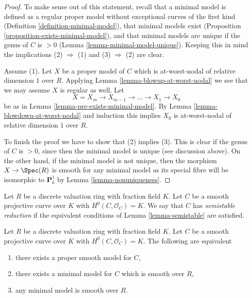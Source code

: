 \begin{proof}
To make sense out of this statement, recall that a
minimal model is defined as a regular proper model
without exceptional curves of the first kind
(Definition \ref{definition-minimal-model}),
that minimal models exist
(Proposition \ref{proposition-exists-minimal-model}), and
that minimal models are unique if the genus
of $C$ is $> 0$ (Lemma \ref{lemma-minimal-model-unique}).
Keeping this in mind the implications (2) $\Rightarrow$ (1)
and (3) $\Rightarrow$ (2) are clear.

\medskip\noindent
Assume (1). Let $X$ be a proper model of $C$ which is
at-worst-nodal of relative dimension $1$ over $R$.
Applying Lemma \ref{lemma-blowup-at-worst-nodal}
we see that we may assume $X$ is regular as well.
Let
$$
X = X_m \to X_{m - 1} \to \ldots \to X_1 \to X_0
$$
be as in Lemma \ref{lemma-pre-exists-minimal-model}.
By Lemma \ref{lemma-blowdown-at-worst-nodal} and induction
this implies $X_0$ is at-worst-nodal of relative dimension $1$ over $R$.

\medskip\noindent
To finish the proof we have to show that (2) implies (3).
This is clear if the genus of $C$ is $> 0$, since then
the minimal model is unique (see discussion above).
On the other hand, if the minimal model is not unique, then
the morphism $X \to \Spec(R)$ is smooth for any minimal model
as its special fibre will be isomorphic to $\mathbf{P}^1_k$
by Lemma \ref{lemma-nonuniqueness}.
\end{proof}

\begin{definition}
\label{definition-semistable}
Let $R$ be a discrete valuation ring with fraction field $K$.
Let $C$ be a smooth projective curve over $K$ with $H^0(C, \mathcal{O}_C) = K$.
We say that $C$ has {\it semistable reduction} if the equivalent
conditions of Lemma \ref{lemma-semistable} are satisfied.
\end{definition}

\begin{lemma}
\label{lemma-good}
Let $R$ be a discrete valuation ring with fraction field $K$.
Let $C$ be a smooth projective curve over $K$ with $H^0(C, \mathcal{O}_C) = K$.
The following are equivalent
\begin{enumerate}
\item there exists a proper smooth model for $C$,
\item there exists a minimal model for $C$ which is smooth over $R$,
\item any minimal model is smooth over $R$.
\end{enumerate}
\end{lemma}

